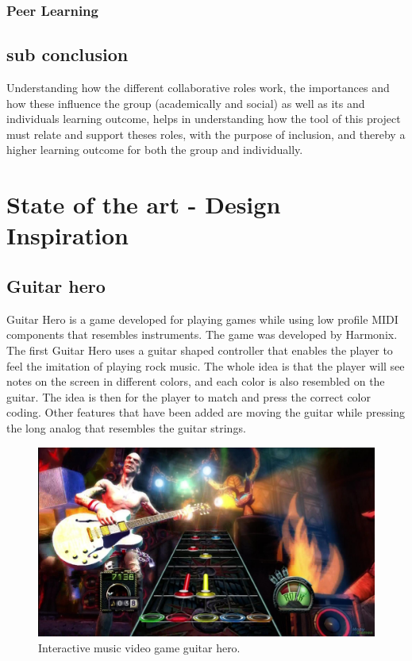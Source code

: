 \subsubsection{Peer Learning}



\subsection{sub conclusion}
Understanding how the different collaborative roles work, the importances and how these influence the group (academically and social) as well as its and individuals learning outcome, helps in understanding how the tool of this project must relate and support theses roles, with the purpose of inclusion, and thereby a higher learning outcome for both the group and individually. 

\section{State of the art - Design Inspiration}\label{sec:sota}


\subsection{Guitar hero}\label{sec:guitarHero} 
Guitar Hero is a game developed for playing games while using low profile MIDI components that resembles instruments. The game was developed by Harmonix. The first Guitar Hero uses a guitar shaped controller that enables the player to feel the imitation of playing rock music. The whole idea is that the player will see notes on the screen in different colors, and each color is also resembled on the guitar. The idea is then for the player to match and press the correct color coding. Other features that have been added are moving the guitar while pressing the long analog that resembles the guitar strings. 
\begin{figure}[H]
	\centering
	\includegraphics[width=0.7\linewidth]{figure/Analysis/guitarhero}
	\caption{Interactive music video game guitar hero.}
	\label{fig:guitarHero}
\end{figure}




